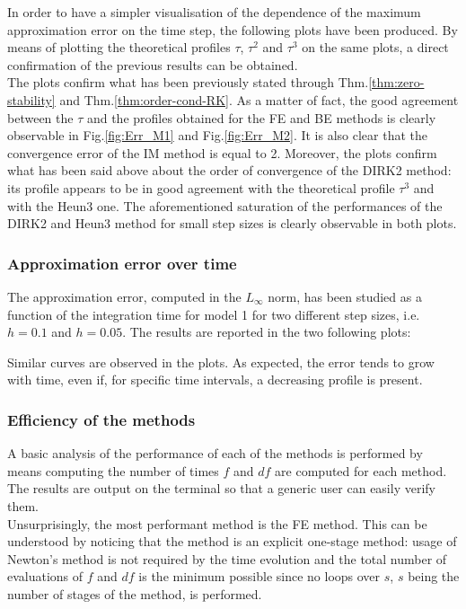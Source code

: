 \documentclass[11pt]{article}
\theoremstyle{theorem}
\theoremstyle{definition}
\begin{document}
In order to have a simpler visualisation of the dependence of the maximum approximation error on the time step, the following plots have been produced. By means of plotting the theoretical profiles $\tau$, $\tau^2$ and $\tau^3$ on the same plots, a direct confirmation of the previous results can be obtained.\\





The plots confirm what has been previously stated through Thm.\ref{thm:zero-stability} and Thm.\ref{thm:order-cond-RK}. As a matter of fact, the good agreement between the $\tau$ and the profiles obtained for the FE and BE methods is clearly observable in Fig.\ref{fig:Err_M1} and Fig.\ref{fig:Err_M2}. It is also clear that the convergence error of the IM method is equal to 2. Moreover, the plots confirm what has been said above about the order of convergence of the DIRK2 method: its profile appears to be in good agreement with the theoretical profile $\tau^3$ and with the Heun3 one. The aforementioned saturation of the performances of the DIRK2 and Heun3 method for small step sizes is clearly observable in both plots.\\

\subsubsection{Approximation error over time}
The approximation error, computed in the $L_\infty$ norm, has been studied as a function of the integration time for model 1 for two different step sizes, i.e. $h=0.1$ and $h=0.05$. The results are reported in the two following plots:



Similar curves are observed in the plots. As expected, the error tends to grow with time, even if, for specific time intervals, a decreasing profile is present.\\

\subsubsection{Efficiency of the methods}
A basic analysis of the performance of each of the methods is performed by means computing the number of times $f$ and $df$ are computed for each method. The results are output on the terminal so that a generic user can easily verify them.\\
Unsurprisingly, the most performant method is the FE method. This can be understood by noticing that the method is an explicit one-stage method: usage of Newton's method is not required by the time evolution and the total number of evaluations of $f$ and $df$ is the minimum possible since no loops over $s$, $s$ being the number of stages of the method, is performed.\\
\end{document}
